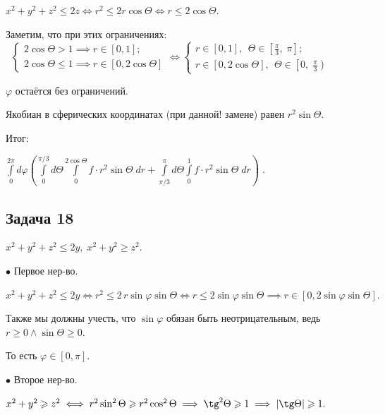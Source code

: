 \documentclass[a4paper, fleqn]{article}
\begin{document}
    $x^2 + y^2 + z^2 \leq 2z \iff r^2 \leq 2 r \cos \Theta \iff r \leq 2 \cos \Theta.$
    
    Заметим, что при этих ограничениях: $\; \; \begin{cases} 
    2 \cos \Theta > 1 \implies r \in [0,1];\\
    2 \cos \Theta \leq 1 \implies r \in [0, 2 \cos \Theta]
    \end{cases} \iff 
    \begin{cases} 
    r \in [0,1], \; \, \Theta \in \left[\frac{\pi}{3}, \; \pi \right];\\
    r \in \left[0, 2 \cos \Theta \right], \; \, \Theta \in \left[0, \; \frac{\pi}{3} \right)
    \end{cases}$
    
    $\varphi$ остаётся без ограничений.
    
    Якобиан в сферических координатах (при данной! замене) равен $r^2 \sin \Theta.$
    
    Итог:
    
    $\boxed{\displaystyle \int\limits_{0 }^{2 \pi} d \varphi\left( 
    \int\limits_{0 }^{\pi/3} d \Theta \int\limits_{0 }^{2 \cos \Theta} f \cdot r^2 \sin \Theta \; dr + 
    \int\limits_{\pi/3 }^{\pi} d \Theta \int\limits_{0 }^{1} f \cdot r^2 \sin \Theta \; dr
    \right) } \; .$
    
    
    
    
    \subsection*{Задача 18}
    
    $x^2 + y^2 + z^2 \leq 2y, \; x^2 + y^2 \geq z^2.$
    
    
    $\bullet$  Первое нер-во.
    
    \onehalfspacing $x^2 + y^2 + z^2 \leq 2y \iff r^2 \leq 2 \, r \sin \varphi \sin \Theta \iff r \leq 2 \sin \varphi \sin \Theta \implies r \in [0, 2 \sin \varphi \sin \Theta].$
    
    \singlespacing Также мы должны учесть, что $\sin{\varphi}$ обязан быть неотрицательным, ведь $r \geq 0 \land \sin \Theta \geq 0.$
    
    То есть $\varphi \in [0, \pi].$
    
    $\bullet$  Второе нер-во.
    
    $x^2 + y^2 \geq z^2 \iff r^2 \sin^2 \Theta \geq r^2 \cos^2 \Theta \implies \tg^2 \Theta \geq 1 \implies |\tg \Theta| \geq 1.$
    
\end{document}
